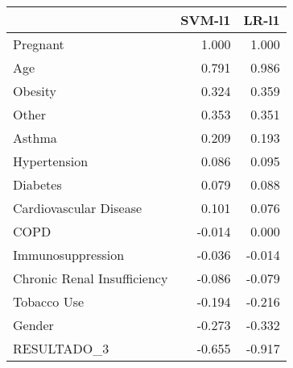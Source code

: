 \begin{tabular}{lrr}
\toprule
{} &  SVM-l1 &  LR-l1 \\
\midrule
Pregnant                    &   1.000 &  1.000 \\
Age                         &   0.791 &  0.986 \\
Obesity                     &   0.324 &  0.359 \\
Other                       &   0.353 &  0.351 \\
Asthma                      &   0.209 &  0.193 \\
Hypertension                &   0.086 &  0.095 \\
Diabetes                    &   0.079 &  0.088 \\
Cardiovascular Disease      &   0.101 &  0.076 \\
COPD                        &  -0.014 &  0.000 \\
Immunosuppression           &  -0.036 & -0.014 \\
Chronic Renal Insufficiency &  -0.086 & -0.079 \\
Tobacco Use                 &  -0.194 & -0.216 \\
Gender                      &  -0.273 & -0.332 \\
RESULTADO\_3                 &  -0.655 & -0.917 \\
\bottomrule
\end{tabular}
